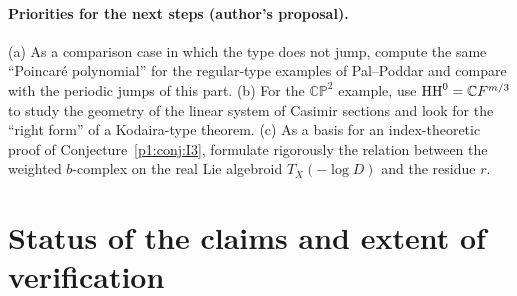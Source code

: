 \paragraph{Priorities for the next steps (author's proposal).}
(a) As a comparison case in which the type does not jump, compute the same ``Poincar\'e polynomial'' for the regular-type examples of Pal--Poddar and compare with the periodic jumps of this part. (b) For the $\mathbb{CP}^2$ example, use $\mathrm{HH}^0=\mathbb C F^{m/3}$ to study the geometry of the linear system of Casimir sections and look for the ``right form'' of a Kodaira-type theorem. (c) As a basis for an index-theoretic proof of Conjecture~\ref{p1:conj:I3}, formulate rigorously the relation between the weighted $b$-complex on the real Lie algebroid $T_X(-\log D)$ and the residue $r$.

\section{Status of the claims and extent of verification}\label{p1:sec:ledger}
